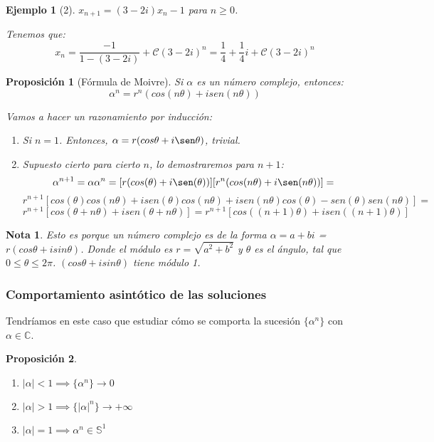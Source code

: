 \documentclass[11pt, a4paper]{article}
\makeatletter
\newif\IfInSansMode
\let\oldsf\sffamily
\renewcommand*{\sffamily}{\oldsf\mathversion{sans}\InSansModetrue}
\let\oldnorm\normalfont
\renewcommand*{\normalfont}{\oldnorm\InSansModefalse\mathversion{normal}}
\renewenvironment{proof}[1][\proofname] {\vspace{-15pt}\par\pushQED{\qed}\normalfont\topsep6\p@\@plus6\p@\relax\trivlist\item[\hskip\labelsep\it#1\@addpunct{.}]\ignorespaces}{\popQED\endtrivlist\@endpefalse}
\numberwithin{equation}{section}
\renewenvironment{proof}[1][\proofname] {\par\pushQED{\qed}\normalfont\topsep6\p@\@plus6\p@\relax\trivlist\item[\hskip\labelsep\itshape\sffamily#1\@addpunct{.}]\ignorespaces}{\popQED\endtrivlist\@endpefalse}
\theoremstyle{theorem-style}
\newtheorem{nprop}{Proposición}[section]
\theoremstyle{definition-style}
\theoremstyle{remark-style}
\newtheorem*{nota}{Nota}
\theoremstyle{example-style}
\newtheorem{ejemplo}{Ejemplo}[section]
\newenvironment{nlist}
{\begin{enumerate}
    \renewcommand\labelenumi{(\emph{\roman{enumi})}}}
  {\end{enumerate}}
\makeatother
\begin{document}
\begin{ejemplo}[2]
	$x_{n+1}=(3-2i)x_n -1$ para $n\geq 0$. 
	\begin{proof}[Solución]
	Tenemos que:
	\[
	x_n = \frac{-1}{1-(3-2i)}+\mathcal{C}(3-2i)^n = \frac{1}{4} + \frac{1}{4}i + \mathcal{C}(3-2i)^n
	\]
\end{proof}
\end{ejemplo}

\begin{nprop}[Fórmula de Moivre]
	Si $\alpha$ es un número complejo, entonces:
	\[
	\alpha^n = r^n(cos(n\theta) + i sen(n\theta))
	\]
	\begin{proof}
	Vamos a hacer un razonamiento por inducción:
	\begin{enumerate}
	\item Si $n=1$. Entonces, $\alpha = r(cos\theta +i\sen\theta)$, trivial.
	\item Supuesto cierto para cierto $n$, lo demostraremos para $n+1$:
	\[
	\alpha^{n+1} = \alpha\alpha^n =  [r(cos(\theta) +i\sen(\theta))] [r^n(cos(n\theta) +i\sen(n\theta))]=
	\]
	\[
	r^{n+1}[cos(\theta) cos(n\theta) +i sen(\theta) cos(n\theta) + isen(n\theta) cos(\theta) - sen(\theta) sen(n\theta)] = \]
	\[r^{n+1}[cos(\theta+n\theta)+isen(\theta+n\theta)] = r^{n+1}[cos((n+1)\theta)+isen((n+1)\theta)]
	\]
\end{enumerate}
	
\end{proof}
\end{nprop}

\begin{nota}
	Esto es porque un número complejo es de la forma $\alpha = a+bi$ = $r(cos\theta + i sin\theta)$.
	Donde el módulo es $r=\sqrt{a^2 + b^2}$ y $\theta$ es el ángulo, tal que $0 \leq \theta \leq 2\pi$.
	$(cos\theta + i sin\theta)$ tiene módulo 1.
	
\end{nota}

\subsubsection{Comportamiento asintótico de las soluciones}
Tendríamos en este caso que estudiar cómo se comporta la sucesión $\{\alpha^n\}$ con $\alpha \in \mathbb{C}$.
\begin{nprop}\hfill
\begin{nlist}
	\item $|\alpha|< 1 \implies \{\alpha^n\}\to 0$
	\item $|\alpha|> 1 \implies \{|\alpha|^n\}\to +\infty$
	\item $|\alpha| = 1 \implies \alpha^n \in \mathbb{S}^1$
\end{nlist}
	
\end{nprop}
\end{document}
